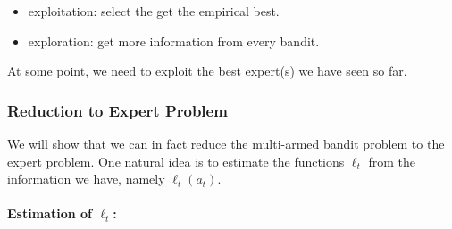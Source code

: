 \documentclass{article}
\begin{document}
\begin{itemize}
    \item exploitation: select the get the empirical best.
    \item exploration: get more information from every bandit.
\end{itemize}
At some point, we need to exploit the best expert(s) we have seen so far.

\subsubsection{Reduction to Expert Problem}
We will show that we can in fact reduce the multi-armed bandit problem to the expert problem. One natural idea is to estimate the functions $\ell_{t}$ from the information we have, namely $\ell_{t}\left(a_{t}\right)$.

\paragraph{Estimation of $\ell_{t}$:}
\end{document}
